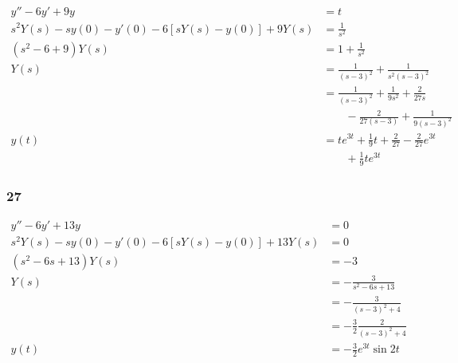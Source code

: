 \documentclass{article}
\begin{document}
\begin{align*}
  y'' - 6 y' + 9 y                                       & = t                                                               \\
  s^2 Y(s) - s y(0) - y'(0) - 6 [s Y(s) - y(0)] + 9 Y(s) & = \frac{1}{s^2}                                                   \\
  (s^2 - 6 + 9) Y(s)                                     & = 1 + \frac{1}{s^2}                                               \\
  Y(s)                                                   & = \frac{1}{(s - 3)^2} + \frac{1}{s^2 (s - 3)^2}                   \\
                                                         & = \frac{1}{(s - 3)^2} + \frac{1}{9 s^2} + \frac{2}{27 s}          \\
                                                         & \qquad - \frac{2}{27 (s - 3)} + \frac{1}{9 (s - 3)^2}             \\
  y(t)                                                   & = t e^{3 t} + \frac{1}{9} t + \frac{2}{27} - \frac{2}{27} e^{3 t} \\
                                                         & \qquad + \frac{1}{9} t e^{3 t}
\end{align*}

\subsubsection{27}

\begin{align*}
  y'' - 6 y' + 13 y                                       & = 0                                    \\
  s^2 Y(s) - s y(0) - y'(0) - 6 [s Y(s) - y(0)] + 13 Y(s) & = 0                                    \\
  (s^2 - 6 s + 13) Y(s)                                   & = -3                                   \\
  Y(s)                                                    & = -\frac{3}{s^2 - 6 s + 13}            \\
                                                          & = -\frac{3}{(s - 3)^2 + 4}             \\
                                                          & = -\frac{3}{2} \frac{2}{(s - 3)^2 + 4} \\
  y(t)                                                    & = -\frac{3}{2} e^{3 t} \sin 2 t
\end{align*}
\end{document}
